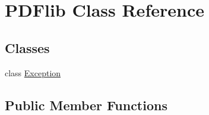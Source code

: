 \hypertarget{classPDFlib}{\section{\-P\-D\-Flib \-Class \-Reference}
\label{classPDFlib}
}
\subsection*{\-Classes}
\begin{DoxyCompactItemize}
\item 
class \hyperlink{classPDFlib_1_1Exception}{\-Exception}
\end{DoxyCompactItemize}
\subsection*{\-Public \-Member \-Functions}
